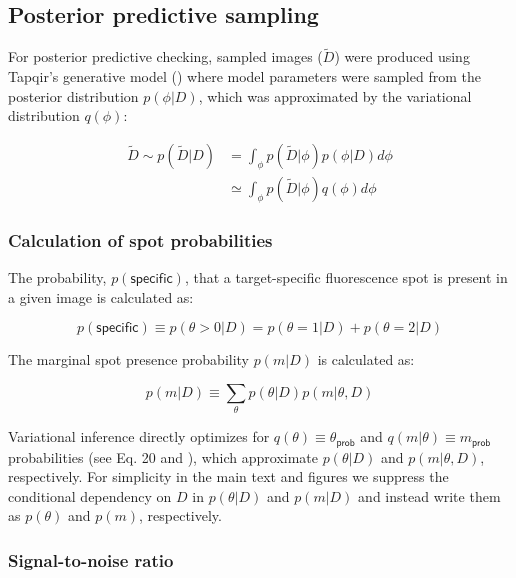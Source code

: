 \subsection{Posterior predictive sampling}

For posterior predictive checking, sampled images ($\widetilde{D}$) were produced using Tapqir's generative model () where model parameters were sampled from the posterior distribution $p(\phi|D)$, which was approximated by the variational distribution $q(\phi)$:

\begin{equation}
\begin{aligned}
    \widetilde{D} \sim p(\widetilde{D} | D) &= \int_\phi p(\widetilde{D} | \phi) p(\phi | D) d\phi \\
    &\simeq \int_\phi p(\widetilde{D} | \phi) q(\phi) d\phi
\end{aligned}
\end{equation}

\subsubsection{Calculation of spot probabilities}

The probability, $p(\mathsf{specific})$, that a target-specific fluorescence spot is present in a given image is calculated as:

\begin{equation}
    p(\mathsf{specific}) \equiv p(\theta > 0 | D) = p(\theta = 1 | D) + p(\theta = 2 | D)
\end{equation}

The marginal spot presence probability $p(m | D)$ is calculated as:

\begin{equation}
    p(m | D) \equiv \sum_\theta p(\theta | D) p(m | \theta, D)
\end{equation}

Variational inference directly optimizes for $q(\theta) \equiv \theta_\mathsf{prob}$ and $q(m | \theta) \equiv m_\mathsf{prob}$ probabilities (see Eq. 20 and ), which approximate $p(\theta | D)$ and $p(m | \theta, D)$, respectively. For simplicity in the main text and figures we suppress the conditional dependency on $D$ in $p(\theta | D)$ and $p(m | D)$ and instead write them as $p(\theta)$ and $p(m)$, respectively.

\subsubsection{Signal-to-noise ratio}


